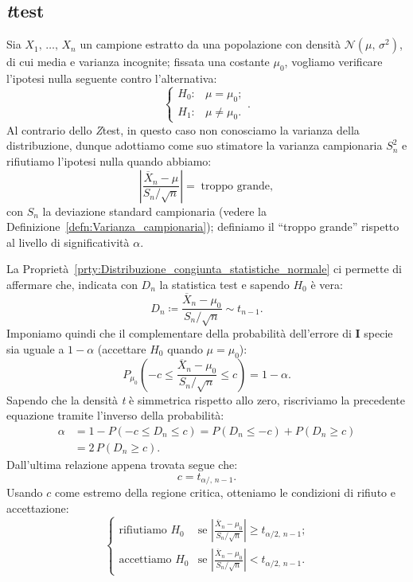         \subsection{\emph{t}\nbdash test}
            \begin{defn}[Bilatero]
                Sia $X_1,\, \ldots,\, X_{n}$ un campione estratto da una popolazione con densità 
                $\mathcal{N}(\mu,\,\sigma^2)$, di cui media e varianza incognite; fissata una costante 
                $\mu_0$, vogliamo verificare l'ipotesi nulla seguente contro l'alternativa: \[
                    \begin{cases}
                        H_0 : & \mu = \mu_0; \\
                        H_1 : & \mu \neq \mu_0.
                    \end{cases}
                .\] Al contrario dello \emph{Z}\nbdash test, in questo caso non conosciamo la varianza della 
                distribuzione, dunque adottiamo come suo stimatore la varianza campionaria $S_n^2$ e 
                rifiutiamo l'ipotesi nulla quando abbiamo: \[
                \left|\frac{\overline{X}_n -\mu}{S_n /\sqrt{n}}\right| =\; \text{troppo grande}
            ,\] con $S_n$ la deviazione standard campionaria (vedere la 
            Definizione~\ref{defn:Varianza_campionaria}); definiamo il ``troppo grande'' rispetto al livello 
            di significatività $\alpha$.

            La Proprietà~\ref{prty:Distribuzione_congiunta_statistiche_normale} ci permette di affermare che, 
            indicata con $D_n$ la statistica test e sapendo $H_0$ è vera: \[
                D_n \coloneqq \frac{\overline{X}_n -\mu_0}{S_n /\sqrt{n}} \sim t_{n-1}
            .\] Imponiamo quindi che il complementare della probabilità dell'errore di $\mathbf{I}$ specie sia 
            uguale a $1-\alpha$ (accettare $H_0$ quando $\mu = \mu_0$): \[
                P_{\mu_0}\left(-c \leq \frac{\overline{X}_n -\mu_0}{S_n /\sqrt{n}} \leq c\right) = 1-\alpha
            .\] Sapendo che la densità \emph{t} è simmetrica rispetto allo zero, riscriviamo la precedente 
            equazione tramite l'inverso della probabilità:
            \begin{align*}
                \alpha &= 1-P(-c \leq D_n \leq c) = P(D_n \leq -c) + P(D_n \geq c) \\
                &= 2\, P(D_n \geq c)
            .\end{align*}
            Dall'ultima relazione appena trovata segue che: \[
                c = t_{\alpha /,\, n-1}
            .\] Usando $c$ come estremo della regione critica, otteniamo le condizioni di rifiuto e 
            accettazione: \[
                \begin{cases}
                    \text{rifiutiamo } H_0 & 
                    \text{se $\left|\frac{\overline{X}_n -\mu_0}{S_n /\sqrt{n}}\right| \geq t_{\alpha /2,\, n-1}$;} \\
                    \text{accettiamo } H_0 & 
                    \text{se $\left|\frac{\overline{X}_n -\mu_0}{S_n /\sqrt{n}}\right| < t_{\alpha /2,\, n-1}$.}
                \end{cases}
            \]
            \end{defn}
